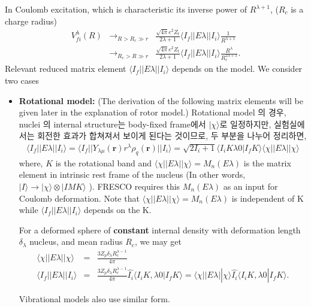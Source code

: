 \documentclass[11pt]{book}
\def\bm{\boldsymbol}
\def\vr{{\bm r}}
\def\la{\langle}
\def\ra{\rangle}
\newcommand{\bea}{\begin{eqnarray}}
\newcommand{\eea}{\end{eqnarray}}
\newcommand{\no}{\nonumber \\}
\begin{document}
In Coulomb excitation, which is characteristic its inverse power of 
$R^{\lambda+1}$, ($R_c$ is a charge radius)
\bea 
V^\lambda_{fi}(R) &\to_{R>R_c \gg r}& 
                 \frac{\sqrt{4\pi}e^2 Z_t}{2\lambda+1}\la I_f||E\lambda||I_i\ra
                 \frac{1}{R^{\lambda+1}} \no 
                 &\to_{R_c > R \gg r}& 
                 \frac{\sqrt{4\pi}e^2 Z_t}{2\lambda+1}\la I_f||E\lambda||I_i\ra
                 \frac{R^\lambda}{R_c^{2\lambda+1}}. 
\eea  
Relevant reduced matrix element $\la I_f||E\lambda||I_i\ra$ depends on the model.
We consider two cases 
\begin{itemize}
\item {\bf Rotational model:} (The derivation of the following matrix elements
      will be given later in the explanation of rotor model.)
      Rotational model 의 경우, nuclei 의 internal structure는 
      body-fixed frame에서 $|\chi\ra$로 일정하지만, 실험실에서는 
      회전한 효과가 합쳐져서 보이게 된다는 것이므로, 두 부분을 나누어 정리하면, 
      \bea 
      \la I_f||E\lambda||I_i\ra =\la I_f|| Y_{\lambda\mu}(\vr) r^\lambda \rho_q(\vr)|| I_i\ra 
        =\sqrt{2I_i+1}\la I_i K \lambda 0| I_f K\ra 
         \la \chi|| E\lambda || \chi\ra 
      \eea 
      where, $K$ is the rotational band and 
      $\la \chi|| E\lambda || \chi\ra = M_n(E\lambda)$ is the matrix element
      in intrinsic rest frame of the nucleus
      (In other words, $|I \ra \to | \chi\ra \otimes |I M K \ra$ ).
      FRESCO requires this $M_n(E\lambda)$
      as an input for Coulomb deformation. Note that 
      $\la \chi|| E\lambda || \chi\ra = M_n(E\lambda)$ is independent of K
      while $\la I_f||E\lambda||I_i\ra$ depends on the K. 

      For a deformed sphere of {\bf constant} internal density with deformation length $\delta_\lambda$ nucleus,
      and mean radius $R_c$, we may get
      \bea 
      \la \chi||E\lambda||\chi\ra &=& \frac{3 Z_p \delta_\lambda R_c^{\lambda-1}}{4\pi}
      \no 
      \la I_f||E\lambda||I_i\ra &=& \frac{3 Z_p \delta_\lambda R_c^{\lambda-1}}{4\pi}
           \hat{I_i} \la I_i K,\lambda 0| I_f K\ra
          = \la \chi||E\lambda||\chi\ra\hat{I_i} \la I_i K,\lambda 0| I_f K\ra
           . 
      \eea 
      
      Vibrational models also use similar form. 
      

\end{itemize}
\end{document}
